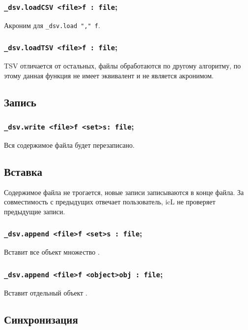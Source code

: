 \documentclass[a4paper, 14pt]{extarticle}
\begin{document}
\subsubsection{\lstinline|_dsv.loadCSV <file>f : file|;}

Акроним для \lstinline|_dsv.load "," f|.

\subsubsection{\lstinline|_dsv.loadTSV <file>f : file|;}

TSV отличается от остальных, файлы обработаются по другому алгоритму, по этому данная функция не имеет эквивалент и не является акронимом.

\subsection{Запись}

\subsubsection{\lstinline|_dsv.write <file>f <set>s: file|;}

Вся содержимое файла будет перезаписано.

\subsection{Вставка}

Содержимое файла не трогается, новые записи записываются в конце файла. За совместимость с предыдущих отвечает пользователь, icL не проверяет предыдущие записи.

\subsubsection{\lstinline|_dsv.append <file>f <set>s : file|;}

Вставит все объект множество .

\subsubsection{\lstinline|_dsv.append <file>f <object>obj : file|;}

Вставит отдельный объект .

\subsection{Синхронизация}
\end{document}
